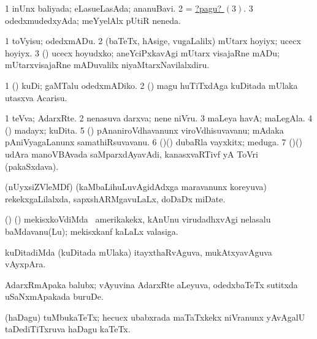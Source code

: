 \noindent 
\gl{\pagu}
\expl{}
\bmng
\bnum
\num{1}  inUnx baliyada; eLasueLasAda; ananuBavi. 
\num{2}  = \hyperlink{wet pagu3}{?pagu? \((3)\)}. 
\hypertarget{wet pagu3}{} 
\num{3}  odedxmudedxyAda; meYyelAlx pUtiR neneda. 
\enum
\emng
\eentry

\bentry
{} 
\gl{\sakirx}
\bmng
\bnum
\num{1} toVyisu; odedxmADu.
\num{2} (baTeTx, hAsige, \mo vugaLalilx) mUtarx hoyiyx; ucecx hoyiyx. 
\num{3} (\AtAmx) ucecx hoyudxko; aneYciPxkavAgi mUtarx visajaRne mADu; mUtarxvisajaRne mADuvalilx niyaMtarxNavilalxdiru. 
\enum
\emng

\noindent 
\gl{\pagu}
\expl{}
\bmng
\bnum
\num{1}  (\AmA) kuDi; gaMTalu odedxmADiko. 
\num{2}  (\ashi) magu huTiTxdAga kuDitada mUlaka utasxva Acarisu. 
\enum
\emng
\eentry

\bentry
{} 
\gl{\nA}
\expl{}
\bmng
\bnum
\num{1} teVva; AdarxRte. 
\num{2} nenasuva darxva; nene niVru. 
\num{3} maLeya havA; maLegAla. 
\num{4} (\AmA) madayx; kuDita. 
\num{5} (\ame) pAnaniroVdhavanunx viroVdhisuvavanu; mAdaka pAniVyagaLanunx samathiRsuvavanu. 
\num{6} (\birx)(\AmA) dubaRla vayxkitx; meduga. 
\num{7} (\birx)(\rAshA) udAra manoVBAvada saMparxdAyavAdi, kanasxvaRTivf yA ToVri (pakaSxdava). 
\enum
\emng
\eentry

\bentry
{} 
\gl{\nA}
\expl{}
\bmng
(nUyxsiZVleMDf) (kaMbaLihuLuvAgidAdxga maravanunx koreyuva) rekekxgaLilalxda, sapxshARMgavuLaLx, doDaDx miDate. 
\emng
\eentry

\bentry
{} 
\gl{\nA}
\expl{}
\bmng
(\ame) (\AmA) mekisxkoVdiMda \kanu\ amerikakekx, kAnUnu virudadhxvAgi nelasalu baMdavanu(Lu); mekisxkanf kaLaLx valasiga. 
\emng
\eentry

\bentry
{} 
\gl{\nA}
\expl{}
\bmng
kuDitadiMda (kuDitada mUlaka) itayxthaRvAguva, mukAtxyavAguva vAyxpAra. 
\emng
\eentry

\bentry
{} 
\gl{\nA}
\expl{}
\bmng
AdarxRmApaka balubx; vAyuvina AdarxRte aLeyuva, odedxbaTeTx sutitxda uSaNxmApakada buruDe. 
\emng
\eentry

\bentry
{} 
\gl{\nA}
\expl{}
\bmng
(haDagu) tuMbukaTeTx; hecucx ubabxrada maTaTxkekx niVranunx yAvAgalU taDediTiTxruva haDagu kaTeTx. 
\emng
\eentry

